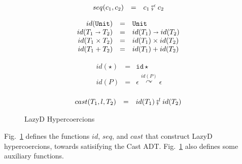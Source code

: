 \documentclass[acmsmall,review,anonymous]{acmart}\settopmatter{printfolios=true,printccs=false,printacmref=false}
\newcommand{\figref}[1]{Fig.~\ref{#1}}
\newcommand{\funrule}[3]{#1 &=& #2 & #3\\}
\newcommand{\plus}[0]{+}
\newcommand{\lazyD}{Lazy\;D}
\newcommand{\POOunit}[0]{\mathtt{Unit}}
\newcommand{\POOfun}[2]{#1 \shortrightarrow #2}
\newcommand{\POOprod}[2]{#1 \times #2}
\newcommand{\POOsum}[2]{#1 \plus #2}
\newcommand{\hyperCoercionI}[0]{\mathtt{id\star}}
\newcommand{\hyperCoercionC}[3]{#1 \overset{#2}{\curvearrowright} #3}
\begin{document}
\begin{figure}
  \[
  \begin{array}{rclr}
  \funrule{seq(c_1,c_2)}{
    c_1 \fatsemi^\epsilon c_2
  }{}
  \end{array}
  \]
  
  \[
  \begin{array}{rclr}
  \funrule{id(\POOunit)}{\POOunit}{}
  \funrule{id(\POOfun{T_1}{T_2})}{
    \POOfun{id(T_1)}{id(T_2)}
  }{}
  \funrule{id(\POOprod{T_1}{T_2})}{
    \POOprod{id(T_1)}{id(T_2)}
  }{}
  \funrule{id(\POOsum{T_1}{T_2})}{
    \POOsum{id(T_1)}{id(T_2)}
  }{}
  \end{array}
  \]
  
  \[
  \begin{array}{rclr}
  \funrule{id(\star)}{
    \hyperCoercionI
  }{}
  \funrule{id(P)}{
    \hyperCoercionC{\epsilon}{id(P)}{\epsilon}
  }{}
  \end{array}
  \]
  
  \[
  \begin{array}{rclr}
  \funrule{cast(T_1,l,T_2)}{
    id(T_1) \fatsemi^l id(T_2)
  }{}
  \end{array}
  \]
  \caption{\lazyD{} Hypercoercions}
  \label{fig:HC-D}
\end{figure}

\figref{fig:HC-D} defines the functions $id$, $seq$, and $cast$ that
construct \lazyD{} hypercoercions, towards satisifying the Cast ADT.
\figref{fig:HC-D} also defines some auxiliary functions.
\end{document}

